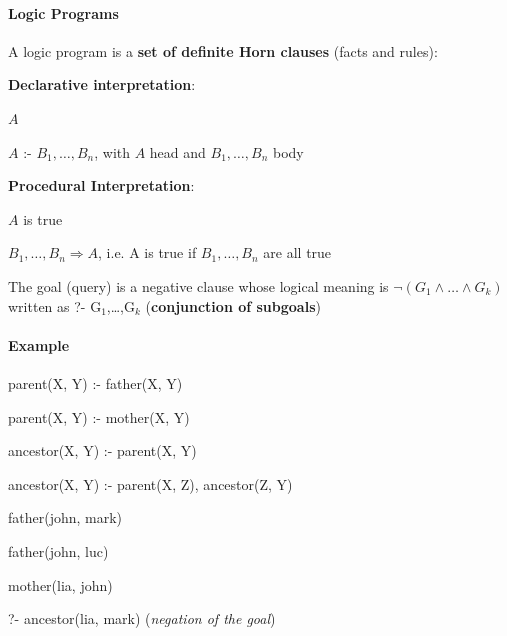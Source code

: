 \documentclass[10pt]{report}
\begin{document}
\paragraph{Logic Programs} A logic program is a \textbf{set of definite Horn clauses} (facts and rules):
\begin{list}{}{}
	\item \textbf{Declarative interpretation}: \begin{list}{}{}
		\item $A$
		\item $A$ :- $B_1,\ldots,B_n$, with $A$ head and $B_1,\ldots,B_n$ body
	\end{list}
	\item \textbf{Procedural Interpretation}: \begin{list}{}{}
		\item $A$ is true
		\item $B_1,\ldots,B_n\Rightarrow A$, i.e. A is true if $B_1,\ldots,B_n$ are all true
		\item The goal (query) is a negative clause whose logical meaning is $\neg(G_1\wedge\ldots\wedge G_k)$ written as ?- G$_1$,\ldots,G$_k$ (\textbf{conjunction of subgoals})
	\end{list}
\end{list}
\paragraph{Example} \begin{list}{}{}
	\item parent(X, Y) :- father(X, Y)
	\item parent(X, Y) :- mother(X, Y)
	\item ancestor(X, Y) :- parent(X, Y)
	\item ancestor(X, Y) :- parent(X, Z), ancestor(Z, Y)
	\item father(john, mark)
	\item father(john, luc)
	\item mother(lia, john)
	\item[?-] ancestor(lia, mark) (\textit{negation of the goal})
\end{list}
\end{document}
